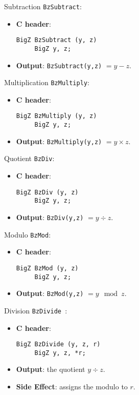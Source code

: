  
\begin{func}  Subtraction \verb+BzSubtract+:
\begin{itemize}
  \item{\bf C header}:
\begin{verbatim}
BigZ BzSubtract (y, z)  
     BigZ y, z;
\end{verbatim}
  \item{\bf Output}: \verb+BzSubtract(y,z)+ $= y-z   $.
\end{itemize}
\end{func}
 
 
\begin{func} Multiplication  \verb+BzMultiply+:
\begin{itemize}
  \item{\bf C header}:
\begin{verbatim}
BigZ BzMultiply (y, z)
     BigZ y, z;
\end{verbatim}
  \item{\bf Output}: \verb+BzMultiply(y,z)+ $= y \times z  $.
\end{itemize}
\end{func}
 
 
\begin{func}  Quotient  \verb+BzDiv+:
\begin{itemize}
  \item{\bf C header}:
\begin{verbatim}
BigZ BzDiv (y, z)
     BigZ y, z;
\end{verbatim}
  \item{\bf Output}: \verb+BzDiv(y,z)+ $= y \div z  $.
\end{itemize}
\end{func}
 
 
\begin{func} Modulo  \verb+BzMod+:
\begin{itemize}
  \item{\bf C header}:
\begin{verbatim}
BigZ BzMod (y, z)
     BigZ y, z;
\end{verbatim}
  \item{\bf Output}: \verb+BzMod(y,z)+ $= y \mod z  $.
\end{itemize}
\end{func}
 
\begin{func} Division  \verb+BzDivide +:
\begin{itemize}
  \item{\bf C header}:
\begin{verbatim}
BigZ BzDivide (y, z, r)
     BigZ y, z, *r;
\end{verbatim}
  \item{\bf Output}: the quotient $y \div z$.
  \item{\bf Side Effect}: assigns the modulo to  $r$.
\end{itemize}
\end{func}
 
